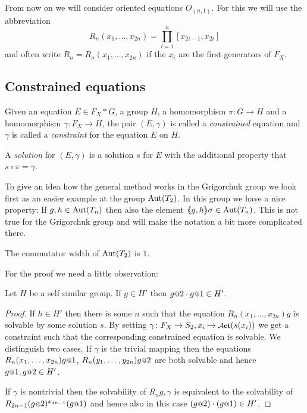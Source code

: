 \documentclass[a4paper,11pt]{amsart}
\begin{document}
From now on we will consider oriented equations $O_{(n,1)}$. For this
we will use the abbreviation
\[R_n(x_1,\ldots,x_{2n})=\prod_{i=1}^n [x_{2i-1},x_{2i}]\]
and often write $R_n=R_n(x_1,\ldots,x_{2n})$ if the $x_i$ are the
first generators of $F_X$.

\subsection{Constrained equations}
\begin{defi}
  Given an equation $E \in F_X*G$, a group $H$, a homomorphism
  $\pi\colon G \to H$ and a homomorphism $\gamma\colon F_X \to H$, the
  pair $(E,\gamma)$ is called a \emph{constrained} equation and
  $\gamma$ is called a \emph{constraint} for the equation $E$ on $H$.
 
  A \emph{solution} for $(E,\gamma)$ is a solution $s$ for $E$ with the
  additional property that $s\circ\pi=\gamma$.
\end{defi}

To give an idea how the general method works in the Grigorchuk group
we look first as an easier example at the group $\textup{Aut}(T_2)$. In this group
we have a nice property: If $g,h\in \textup{Aut}(T_n)$ then also the element 
$\langle\negthickspace\langle g,h\rangle\negthickspace\rangle\sigma\in \textup{Aut}(T_n)$. This is not true for the Grigorchuk group
and will make the notation a bit more complicated there.

\begin{pro}\label{pro:comwidthAutT2}
 The commutator width of $\textup{Aut}(T_2)$ is $1$.
\end{pro}
For the proof we need a little observation:
\begin{lem}
  Let $H$ be a self similar group.
  If $g\in H'$ then $g\at{2}\cdot g\at{1}\in H'$. 
\end{lem}
  \begin{proof}
 If $h\in H'$ then there is some $n$ such that the equation $R_n(x_1,\ldots,x_{2n})g$ is 
 solvable by some solution $s$. By setting $\gamma\colon F_X\to S_2, x_i\mapsto \act(s(x_i))$
 we get a constraint such that the corresponding constrained equation is solvable. 
 We distinguish two cases. If $\gamma$ is the trivial mapping 
 then the equations $R_n(x_1,\ldots,x_{2n})g\at{1}$,
 $R_n(y_1,\ldots,y_{2n})g\at{2}$ are both solvable and hence
 $g\at{1},g\at{2} \in H'$. 
 
 If $\gamma$ is nontrivial then the solvability of $R_ng,\gamma$ is equivalent 
 to the solvability of $R_{2n-1}(g\at{2})^{x_{4n-1}}(g\at{1})$ and hence 
 also in this case $(g\at{2})\cdot(g\at{1})\in H'$.
\end{proof}
\end{document}
